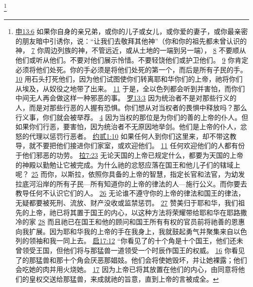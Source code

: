 \documentclass[12pt, a4paper, oneside]{ctexart}
\begin{document}
	\footnote {
		\href{https://biblehub.com/deuteronomy/13-6.htm}{申13:6} 如果你自身的亲兄弟，或你的儿子或女儿，或你爱的妻子，或你最亲密的朋友暗中引诱你，说：“让我们去敬拜其他神”（你和你的祖先都未曾认识的神，
		\href{https://biblehub.com/deuteronomy/13-7.htm}{7} 你周边列族的神，不管远近，或从土地的一端到另一端），
		\href{https://biblehub.com/deuteronomy/13-8.htm}{8} 不要顺从他们或听从他们。不要对他们展示怜惜。不要轻饶他们或护卫他们。
		\href{https://biblehub.com/deuteronomy/13-9.htm}{9} 你肯定必须将他们处死。你的手必须是将他们处死的第一个，而后是所有子民的手。
		\href{https://biblehub.com/deuteronomy/13-10.htm}{10} 用石头打死他们，因为他们试图使你们转离耶和华你们的上帝，祂将你们从埃及，从奴役之地带了出来。
		\href{https://biblehub.com/deuteronomy/13-11.htm}{11} 于是，全以色列都会听到并害怕，而你们中间无人再会做这样一种邪恶的事。
		\href{https://biblehub.com/romans/13-3.htm}{罗13:3} 因为统治者不是对那些行义的人，而是对那些行恶的人握有恐惧。你们想从对当权者的畏惧中释放吗？那么行义事，你们就会被举荐。
		\href{https://biblehub.com/romans/13-4.htm}{4} 因为当权的那位是为你们的善的上帝的仆人。但如果你们行恶，要害怕，因为统治者不无原因地举剑。他们是上帝的仆人，忿怒的代理以惩罚行恶者。
		\href{https://biblehub.com/2_john/1-10.htm}{约贰1:10} 如果任何人到你们这里来，却不带这教导，就不要把他们接进你们家室，或欢迎他们。
		\href{https://biblehub.com/2_john/1-11.htm}{11} 任何欢迎他们的人都有份于他们邪恶的功劳。
		\href{https://biblehub.com/ezra/7-23.htm}{拉7:23} 无论天国的上帝已规定什么，都要为天国的上帝的神殿以勤勉让它被完成。为什么祂的忿怒应落在国王和他儿子们的辖域上呢？
		\href{https://biblehub.com/ezra/7-25.htm}{25} 而你，以斯拉，依照你具备的上帝的智慧，指定长官和法官，为幼发拉底河沿岸的所有子民---所有知道你的上帝的律法的人---施行公义。而你要去教导任何不认识它们的人。
		\href{https://biblehub.com/ezra/7-26.htm}{26} 无论谁不遵守你的上帝的律法和国王的律法，无疑都要被死刑、流放、财产没收或监禁惩罚。
		\href{https://biblehub.com/ezra/7-27.htm}{27} 赞美归于耶和华，我们祖先的上帝，祂已将其置于国王的内心，以这种方法将荣耀带给耶和华在耶路撒冷的家
		\href{https://biblehub.com/ezra/7-28.htm}{28} 而且祂已在国王和他的顾问和国王所有有权的官员前将祂善的恩惠向我扩展。因为耶和华我的上帝的手在我身上，我就鼓起勇气并聚集来自以色列的领袖和我一同上去。
		\href{https://biblehub.com/revelation/17-12.htm}{启17:12} “你看见了的十个角是十个国王，他们还未曾领受王国，但他们将与那猛兽一道领受一个时辰作国王的权威。
		\href{https://biblehub.com/revelation/17-16.htm}{16} 你看见了的那猛兽和那十个角会厌恶那娼妓。他们会将使她毁坏，并让她裸露；他们会吃她的肉并用火烧她。
		\href{https://biblehub.com/revelation/17-17.htm}{17} 因为上帝已将其放置在他们的内心，由同意将他们的皇权交送给那猛兽，来成就祂的旨意，直到上帝的言被成全。
}
\end{document}
